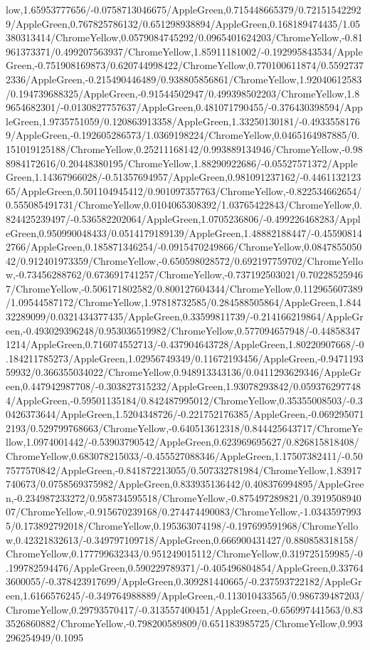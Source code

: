 {\begin{tikzternal}
low,1.65953777656/-0.0758713046675/AppleGreen,0.715448665379/0.721515422929/AppleGreen,0.767825786132/0.651298938894/AppleGreen,0.168189474435/1.05380313414/ChromeYellow,0.0579084745292/0.0965401624203/ChromeYellow,-0.81961373371/0.499207563937/ChromeYellow,1.85911181002/-0.192995843534/AppleGreen,-0.751908169873/0.620744998422/ChromeYellow,0.770100611874/0.55927372336/AppleGreen,-0.215490446489/0.938805856861/ChromeYellow,1.92040612583/0.194739688325/AppleGreen,-0.91544502947/0.499398502203/ChromeYellow,1.89654682301/-0.0130827757637/AppleGreen,0.481071790455/-0.376430398594/AppleGreen,1.9735751059/0.120863913358/AppleGreen,1.33250130181/-0.49335581769/AppleGreen,-0.192605286573/1.0369198224/ChromeYellow,0.0465164987885/0.151019125188/ChromeYellow,0.25211168142/0.993889134946/ChromeYellow,-0.988984172616/0.20448380195/ChromeYellow,1.88290922686/-0.05527571372/AppleGreen,1.14367966028/-0.51357694957/AppleGreen,0.981091237162/-0.446113212365/AppleGreen,0.501104945412/0.901097357763/ChromeYellow,-0.822534662654/0.555085491731/ChromeYellow,0.0104065308392/1.03765422843/ChromeYellow,0.824425239497/-0.536582202064/AppleGreen,1.0705236806/-0.499226468283/AppleGreen,0.950990048433/0.0514179189139/AppleGreen,1.48882188447/-0.455908142766/AppleGreen,0.185871346254/-0.0915470249866/ChromeYellow,0.084785505042/0.912401973359/ChromeYellow,-0.650598028572/0.692197759702/ChromeYellow,-0.73456288762/0.673691741257/ChromeYellow,-0.737192503021/0.702285259467/ChromeYellow,-0.506171802582/0.800127604344/ChromeYellow,0.112965607389/1.09544587172/ChromeYellow,1.97818732585/0.284588505864/AppleGreen,1.84432289099/0.0321434377435/AppleGreen,0.33599811739/-0.214166219864/AppleGreen,-0.493029396248/0.953036519982/ChromeYellow,0.577094657948/-0.448583471214/AppleGreen,0.716074552713/-0.437904643728/AppleGreen,1.80220907668/-0.184211785273/AppleGreen,1.02956749349/0.11672193456/AppleGreen,-0.947119359932/0.366355034022/ChromeYellow,0.948913343136/0.0411293629346/AppleGreen,0.447942987708/-0.303827315232/AppleGreen,1.93078293842/0.0593762977484/AppleGreen,-0.59501135184/0.842487995012/ChromeYellow,0.35355008503/-0.30426373644/AppleGreen,1.5204348726/-0.221752176385/AppleGreen,-0.0692950712193/0.529799768663/ChromeYellow,-0.640513612318/0.844425643717/ChromeYellow,1.0974001442/-0.53903790542/AppleGreen,0.623969695627/0.826815818408/ChromeYellow,0.683078215033/-0.455527088346/AppleGreen,1.17507382411/-0.507577570842/AppleGreen,-0.841872213055/0.507332781984/ChromeYellow,1.83917740673/0.0758569375982/AppleGreen,0.833935136442/0.408376994895/AppleGreen,-0.234987233272/0.958734595518/ChromeYellow,-0.875497289821/0.391950894007/ChromeYellow,-0.915670239168/0.274474490083/ChromeYellow,-1.03435979935/0.173892792018/ChromeYellow,0.195363074198/-0.197699591968/ChromeYellow,0.42321832613/-0.349797109718/AppleGreen,0.666900431427/0.880858318158/ChromeYellow,0.177799632343/0.951249015112/ChromeYellow,0.319725159985/-0.199782594476/AppleGreen,0.590229789371/-0.405496804854/AppleGreen,0.337643600055/-0.378423917699/AppleGreen,0.309281440665/-0.237593722182/AppleGreen,1.6166576245/-0.349764988889/AppleGreen,-0.113010433565/0.986739487203/ChromeYellow,0.29793570417/-0.313557400451/AppleGreen,-0.656997441563/0.833526860882/ChromeYellow,-0.798200589809/0.651183985725/ChromeYellow,0.993296254949/0.1095
\end{tikzternal}}
